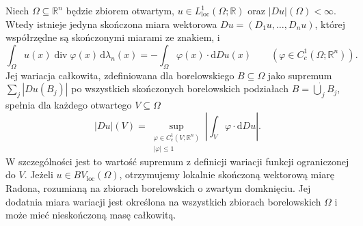 \begin{twierdzenie}
\label{thm:BV-measure-29}
Niech $\Omega\subseteq\mathbb R^n$ będzie zbiorem otwartym,
$u\in L^1_{\mathrm{loc}}(\Omega;\mathbb R)$ oraz
$|Du|(\Omega)<\infty$. Wtedy istnieje jedyna
skończona miara wektorowa $Du=(D_1u,\ldots,D_nu)$,
której współrzędne są skończonymi miarami ze znakiem,
i
\[
 \int_\Omega u(x)\operatorname{div}\varphi(x)
 \,\mathrm d\lambda_n(x)
 =-\int_\Omega\varphi(x)\cdot\mathrm dDu(x)
 \qquad(\varphi\in C_c^1(\Omega;\mathbb R^n)).
\]
Jej wariacja całkowita, zdefiniowana dla borelowskiego
$B\subseteq\Omega$ jako supremum
$\sum_j|Du(B_j)|$ po wszystkich skończonych
borelowskich podziałach $B=\dot\bigcup_j B_j$,
spełnia dla każdego otwartego $V\subseteq\Omega$
\[
 |Du|(V)=\sup_{\substack{\varphi\in C_c^1(V;\mathbb R^n)\\
                         |\varphi|\le1}}
 \left|\int_V\varphi\cdot\mathrm dDu\right|.
\]
W szczególności jest to wartość supremum z definicji
wariacji funkcji ograniczonej do $V$.
Jeżeli $u\in BV_{\mathrm{loc}}(\Omega)$,
otrzymujemy lokalnie skończoną wektorową miarę
Radona, rozumianą na zbiorach borelowskich o
zwartym domknięciu. Jej dodatnia miara wariacji
jest określona na wszystkich zbiorach borelowskich
$\Omega$ i może mieć nieskończoną masę całkowitą.
\end{twierdzenie}
